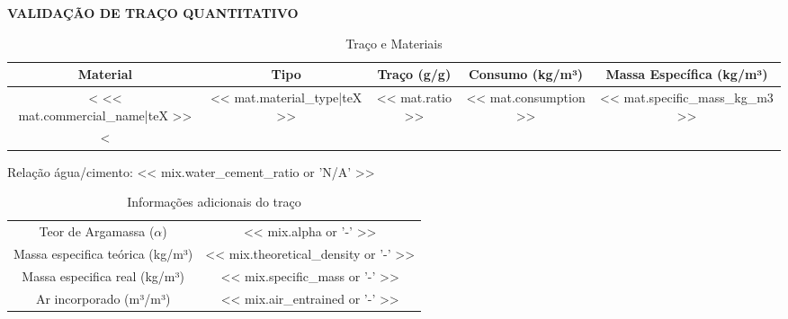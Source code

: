 \documentclass{article}
\begin{document}
\thispagestyle{fancy} 
\begin{center}
    \textbf{\Large VALIDAÇÃO DE TRAÇO QUANTITATIVO}
\end{center}

\vspace{0.5cm}

\begin{table}[h]
    \centering
    \caption{Traço e Materiais}
    \vspace{0.2cm}
    
    \begin{tabular}{|c|c|c|c|c|}
        \hline 
        Material & Tipo & Traço (g/g) & Consumo (kg/m³) & Massa Específica (kg/m³) \\ 
        \hline
        <%
        << mat.commercial_name|teX >> & << mat.material_type|teX >> & << mat.ratio >> & << mat.consumption >> & << mat.specific_mass_kg_m3 >> \\
        \hline
        <%
    \end{tabular}
    
    \label{tab:meu_exemplo}
\end{table}

\vspace{0.3cm}
\noindent Relação água/cimento: << mix.water_cement_ratio or 'N/A' >>

\vspace{0.5cm}

\begin{table}[h] 
    \centering  
    \caption{Informações adicionais do traço} 
    \vspace{0.2cm}

    \begin{tabular}{|c|c|}
        \hline 
        Teor de Argamassa ($\alpha$) & << mix.alpha or '-' >> \\
        Massa especifica teórica (kg/m³) & << mix.theoretical_density or '-' >> \\
        Massa especifica real (kg/m³) & << mix.specific_mass or '-' >> \\
        Ar incorporado (m³/m³) & << mix.air_entrained or '-' >> \\
        \hline
    \end{tabular}
\end{table}
\end{document}

